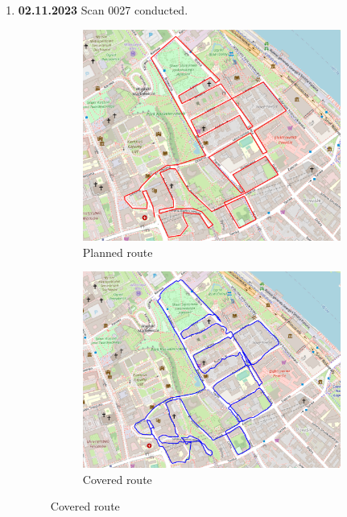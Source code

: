 \documentclass[a4paper,12pt]{article}
\begin{document}
\begin{enumerate}
	\item \textbf{02.11.2023} Scan 0027 conducted.
	\begin{figure}[H]
		\centering
		\begin{subfigure}{.88\textwidth}
			\centering
			\includegraphics[width=1\linewidth]{route_p27}
			\caption{Planned route}
			\label{fig:a27}
		\end{subfigure}%
		\linebreak
		\begin{subfigure}{.88\textwidth}
			\centering
			\includegraphics[width=1\linewidth]{route_c27}
			\caption{Covered route}
			\label{fig:b27}
		\end{subfigure}

\end{figure}
\end{enumerate}
\end{document}
